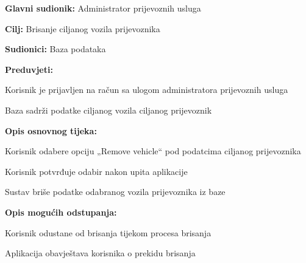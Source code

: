 					\noindent {}
					\begin{packed_item}
						\item \textbf{Glavni sudionik:} Administrator prijevoznih usluga
						\item  \textbf{Cilj:} Brisanje ciljanog vozila prijevoznika
						\item  \textbf{Sudionici:} Baza podataka
						\item  \textbf{Preduvjeti:}
						\item[] \begin{packed_enum}
							\item Korisnik je prijavljen na račun sa ulogom administratora prijevoznih usluga
							\item Baza sadrži podatke ciljanog vozila ciljanog prijevoznik
						\end{packed_enum}
						
						\item  \textbf{Opis osnovnog tijeka:}
						\item[] \begin{packed_enum}
							\item Korisnik odabere opciju „Remove vehicle“ pod podatcima ciljanog prijevoznika
							\item Korisnik potvrđuje odabir nakon upita aplikacije
							\item Sustav briše podatke odabranog vozila prijevoznika iz baze
						\end{packed_enum}
					
						\item  \textbf{Opis mogućih odstupanja:}
						\item[] \begin{packed_item}
							\item[2.a] Korisnik odustane od brisanja tijekom procesa brisanja
							\item[] \begin{packed_enum}
								\item Aplikacija obavještava korisnika o prekidu brisanja
							\end{packed_enum}
						\end{packed_item}
					\end{packed_item}
					
